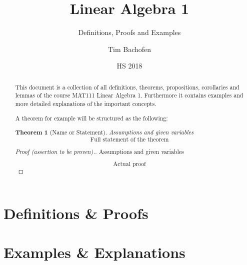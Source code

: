 \documentclass[english,titlepage]{uzhpub}
\theoremstyle{definition}
\theoremstyle{plain}
\newtheorem*{theorem*}{Theorem} %
\theoremstyle{remark}
\theoremstyle{example}
\begin{document}
   \title{Linear Algebra 1}
   \subtitle{Definitions, Proofs and Examples}
   \author{Tim Bachofen}
   \date{HS 2018}

   \maketitle

   \begin{abstract}
      This document is a collection of all definitions, theorems, propositions, corollaries and lemmas of the course MAT111 Linear Algebra 1.
      Furthermore it contains examples and more detailed explanations of the important concepts.

      A theorem for example will be structured as the following:

      \begin{theorem*}[Name or Statement]
         Assumptions and given variables
         \[\text{Full statement of the theorem}\]
      \end{theorem*}
      \begin{proof}[Proof (assertion to be proven).]
         Assumptions and given variables

         \[\text{Actual proof}\]
      \end{proof}
   \end{abstract}

   \newpage
   \tableofcontents
   \newpage

   \listoftheorems[ignoreall, show={definition,theorem,proposition,corollary,lemma}]

   \newpage

   \part{Definitions & Proofs}
   
   \newpage
   
   \newpage
   
   \newpage
   
   \newpage
   
   \newpage
   
   \newpage
   
   \newpage
   

   \newpage
   \part{Examples & Explanations}
   


   \newpage
   \printglossaries{}
\end{document}
